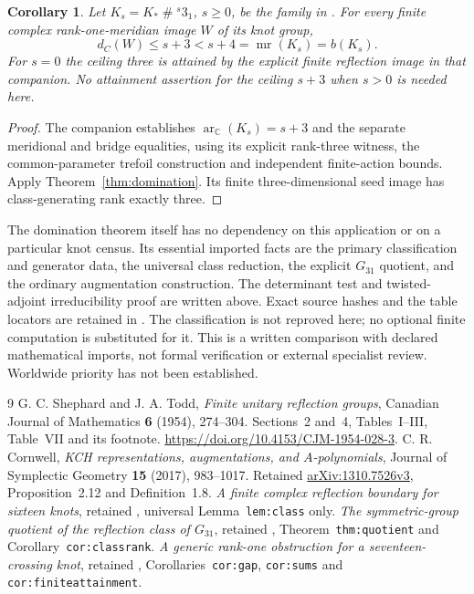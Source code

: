 \documentclass[11pt]{article}
\newtheorem{corollary}[theorem]{Corollary}
\newcommand{\C}{\mathbb C}
\newcommand{\ar}{\operatorname{ar}_{\C}}
\begin{document}
\begin{corollary}\label{cor:knots}
Let $K_s=K_*\mathbin{\#}{}^s3_1$, $s\ge0$, be the family in
\cite{new17}. For every finite complex rank-one-meridian image
$W$ of its knot group,
\[
                     d_C(W)\le s+3<s+4=\operatorname{mr}(K_s)=b(K_s).
\]
For $s=0$ the ceiling three is attained by the explicit finite
reflection image in that companion. No attainment assertion for
the ceiling $s+3$ when $s>0$ is needed here.
\end{corollary}
\begin{proof}
The companion establishes $\ar(K_s)=s+3$ and the separate
meridional and bridge equalities, using its explicit rank-three
witness, the common-parameter trefoil construction and independent
finite-action bounds. Apply Theorem~\ref{thm:domination}.
Its finite three-dimensional seed image has class-generating
rank exactly three.
\end{proof}

The domination theorem itself has no dependency on this application
or on a particular knot census.
Its essential imported facts are the primary classification and
generator data, the universal class reduction, the explicit
$G_{31}$ quotient, and the ordinary augmentation construction.
The determinant test and twisted-adjoint irreducibility proof
are written above.
Exact source hashes and the table locators are retained in
.
The classification is not reproved here; no optional finite
computation is substituted for it.
This is a written comparison with declared mathematical imports,
not formal verification or external specialist review.
Worldwide priority has not been established.

\begin{thebibliography}{9}\small
{}
G. C. Shephard and J. A. Todd,
\emph{Finite unitary reflection groups},
Canadian Journal of Mathematics \textbf{6} (1954), 274--304.
Sections~2 and~4, Tables~I--III, Table~VII and its footnote.
\url{https://doi.org/10.4153/CJM-1954-028-3}.
C. R. Cornwell,
\emph{KCH representations, augmentations, and $A$-polynomials},
Journal of Symplectic Geometry \textbf{15} (2017), 983--1017.
Retained \href{https://arxiv.org/abs/1310.7526v3}{arXiv:1310.7526v3},
Proposition~2.12 and Definition~1.8.
\emph{A finite complex reflection boundary for sixteen knots},
retained ,
universal Lemma~\texttt{lem:class} only.
\emph{The symmetric-group quotient of the reflection class of $G_{31}$},
retained ,
Theorem~\texttt{thm:quotient} and
Corollary~\texttt{cor:classrank}.
\emph{A generic rank-one obstruction for a seventeen-crossing knot},
retained ,
Corollaries~\texttt{cor:gap}, \texttt{cor:sums} and
\texttt{cor:finiteattainment}.
\end{thebibliography}
\end{document}
